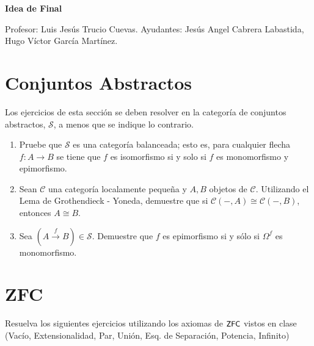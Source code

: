 \documentclass[12pt]{article}
\newcommand{\topos}[1]{\mathscr{#1}}
\newcommand{\ms}[1]{\mathscr{#1}}
\newcommand{\zfc}{\text{\textsf{\small ZFC}}}
\begin{document}
   

  \begin{center}
   \Huge \textbf{Idea de Final} \\
  \end{center}

  \begin{flushright}
   \footnotesize Profesor: Luis Jesús Trucio Cuevas. \hfill Ayudantes: Jesús Angel Cabrera Labastida,\\
   \hfill Hugo Víctor García Martínez.
  \end{flushright}

  \section*{Conjuntos Abstractos}
    Los ejercicios de esta sección se deben resolver en la categoría de conjuntos abstractos, \(\topos{S}\), a menos que se indique lo contrario.

    \begin{enumerate}[\bf\text{Ej.} 1.]
    \item Pruebe que $\ms{S}$ es una categoría balanceada; esto es, para cualquier flecha $f:A \to B$ se tiene que $f$ es isomorfismo si y solo si $f$ es monomorfismo y epimorfismo.
    
    \item Sean $\ms{C}$ una categoría localamente pequeña y $A,B$ objetos de $\ms{C}$. Utilizando el Lema de Grothendieck - Yoneda, demuestre que si $\ms{C}(-,A) \cong \ms{C}(-,B)$, entonces $A \cong B$.
    
    \item Sea $(A \xrightarrow{f} B) \in \ms{S}$. Demuestre que $f$ es epimorfismo si y sólo si $\Omega^f$ es monomorfismo.
    
    
    \end{enumerate}

    \section*{ZFC}
    Resuelva los siguientes ejercicios utilizando los axiomas de $\zfc$ vistos en clase (Vacío, Extensionalidad, Par, Unión, Esq. de Separación, Potencia, Infinito)
\end{document}
